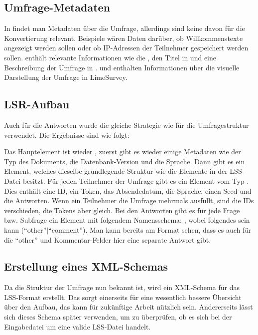 \subsection{Umfrage-Metadaten}
\label{a:survey_meta}

In  findet man Metadaten über die Umfrage, allerdings sind keine davon für die Konvertierung relevant.
Beispiele wären Daten darüber, ob Willkommenstexte angezeigt werden sollen oder ob IP-Adressen der Teilnehmer gespeichert werden sollen.
 enthält relevante Informationen wie die , den Titel in  und eine Beschreibung der Umfrage in .
 und  enthalten Informationen über die visuelle Darstellung der Umfrage in LimeSurvey.

\subsection{LSR-Aufbau}

Auch für die Antworten wurde die gleiche Strategie wie für die Umfragestruktur verwendet.
Die Ergebnisse sind wie folgt:

Das Hauptelement ist wieder , zuerst gibt es wieder einige Metadaten wie der Typ des Dokuments, die Datenbank-Version und die Sprache.
Dann gibt es ein  Element, welches dieselbe grundlegende Struktur wie die Elemente in der LSS-Datei besitzt.
Für jeden Teilnehmer der Umfrage gibt es ein Element vom Typ .
Dies enthält eine ID, ein Token, das Absendedatum, die Sprache, einen Seed und die Antworten.
Wenn ein Teilnehmer die Umfrage mehrmals ausfüllt, sind die IDs verschieden, die Tokens aber gleich.
Bei den Antworten gibt es für jede Frage bzw. Subfrage ein Element mit folgendem Namensschema: 
, wobei  folgendes sein kann (\enquote{other}$\vert$\enquote{comment}).
Man kann bereits am Format sehen, dass es auch für die \enquote{other} und Kommentar-Felder hier eine separate Antwort gibt.

\subsection{Erstellung eines XML-Schemas}
\label{an:xsd}
Da die Struktur der Umfrage nun bekannt ist, wird ein XML-Schema für das LSS-Format erstellt.
Das sorgt einerseits für eine wesentlich bessere Übersicht über den Aufbau, das kann für zukünftige Arbeit nützlich sein.
Andererseits lässt sich dieses Schema später verwenden, um zu überprüfen, ob es sich bei der Eingabedatei um eine valide LSS-Datei handelt.


